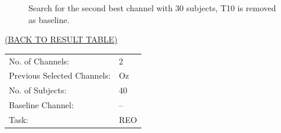 \documentclass[oneside, a4paper,10pt]{report}
\begin{document}
\begin{figure}[H]
  \caption{Search for the second best channel with $30$ subjects, T10 is removed as baseline.}
  \label{fg:2Ch_S30_B1}
\end{figure}

\newpage

\hspace*{12cm}\hyperlink{tab:TestResults}{(BACK TO RESULT TABLE)}

\bigskip
\bigskip

\begin{tabular}{ll}
  No. of Channels: & 2\\
  Previous Selected Channels: & Oz\\
  No. of Subjects: & 40\\
  Baseline Channel: & --\\
  Task:	& REO 
\end{tabular}

\bigskip
\end{document}

